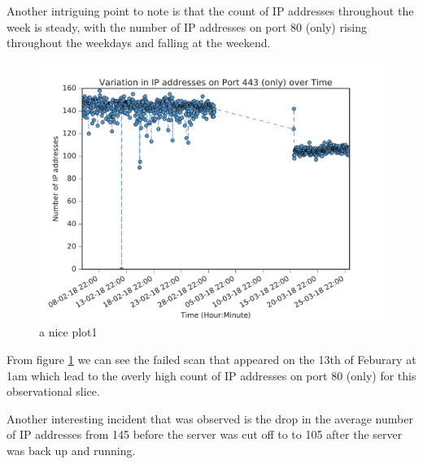\documentclass[a4wide,leqno,12pt]{report}
\begin{document}
Another intriguing  point to note is that the count of IP addresses throughout the week is steady, with the number of IP addresses on port 80 (only) rising throughout the weekdays and falling at the weekend.\\

\begin{figure}[H]
\centering
\includegraphics[scale=.5]{pdf_images/VariationInIpAddressesOnPort443OverTime}
\caption{a nice plot1}
\label{fig:port443ZMap}
\end{figure}



From figure \ref{fig:port443ZMap} we can see the failed scan that appeared on the 13th of Feburary at 1am which lead to the overly high count of IP addresses on port 80 (only) for this observational slice.

Another interesting incident that was observed is the drop in the average number of IP addresses from 145 before the server was cut off to to 105 after the server was back up and running.
\end{document}
